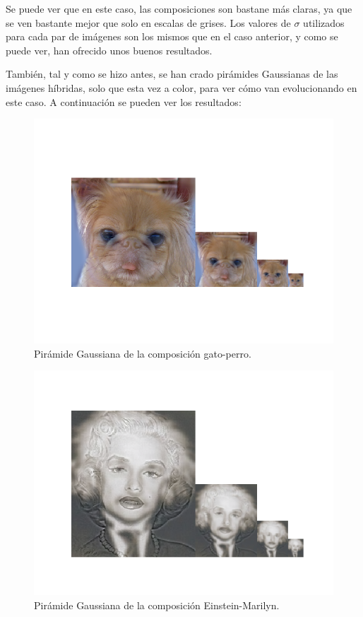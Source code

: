 \documentclass[11pt,a4paper]{article}
\begin{document}
Se puede ver que en este caso, las composiciones son bastane más claras, ya que se ven bastante mejor que solo
en escalas de grises. Los valores de $\sigma$ utilizados para cada par de imágenes son los mismos que en el caso anterior,
y como se puede ver, han ofrecido unos buenos resultados.

También, tal y como se hizo antes, se han crado pirámides Gaussianas de las imágenes híbridas, solo que esta vez a color,
para ver cómo van evolucionando en este caso. A continuación se pueden ver los resultados:

\begin{figure}[H]
\centering
\includegraphics[scale=0.7]{img/c-hyb-pyr1.png}
\caption{Pirámide Gaussiana de la composición gato-perro.}
\label{fig:c-hyb-pyr1}
\end{figure}

\begin{figure}[H]
\centering
\includegraphics[scale=0.7]{img/c-hyb-pyr2.png}
\caption{Pirámide Gaussiana de la composición Einstein-Marilyn.}
\label{fig:c-hyb-pyr2}
\end{figure}
\end{document}
